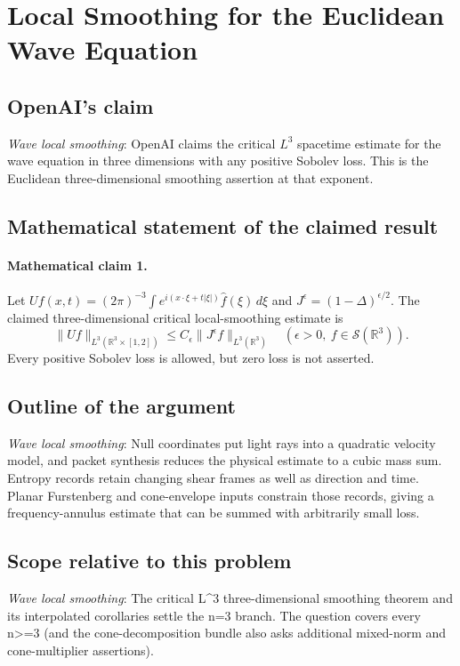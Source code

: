 \documentclass[11pt]{article}
\begin{document}
\section*{Local Smoothing for the Euclidean Wave Equation}

\subsection{OpenAI's claim}
\textit{Wave local smoothing}: OpenAI claims the critical $L^3$ spacetime estimate for the wave equation in three dimensions with any positive Sobolev loss. This is the Euclidean three-dimensional smoothing assertion at that exponent.

\subsection{Mathematical statement of the claimed result}
\paragraph{Mathematical claim 1.} Let $Uf(x,t)=(2\pi)^{-3}\int e^{i(x\cdot\xi+t|\xi|)}\widehat f(\xi)\,d\xi$ and $J^\epsilon=(1-\Delta)^{\epsilon/2}$. The claimed three-dimensional critical local-smoothing estimate is \[\|Uf\|_{L^3(\mathbb R^3\times[1,2])}\le C_\epsilon\|J^\epsilon f\|_{L^3(\mathbb R^3)}\quad(\epsilon>0,\ f\in\mathcal S(\mathbb R^3)).\] Every positive Sobolev loss is allowed, but zero loss is not asserted.

\subsection{Outline of the argument}
\textit{Wave local smoothing}: Null coordinates put light rays into a quadratic velocity model, and packet synthesis reduces the physical estimate to a cubic mass sum. Entropy records retain changing shear frames as well as direction and time. Planar Furstenberg and cone-envelope inputs constrain those records, giving a frequency-annulus estimate that can be summed with arbitrarily small loss.

\subsection{Scope relative to this problem}
\textit{Wave local smoothing}: The critical L\textasciicircum{}3 three-dimensional smoothing theorem and its interpolated corollaries settle the n=3 branch. The question covers every n>=3 (and the cone-decomposition bundle also asks additional mixed-norm and cone-multiplier assertions).
\end{document}
